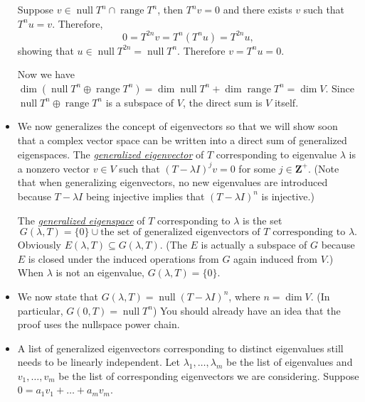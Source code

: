 \documentclass{article}
\newcommand{\df}[1]{\ul{\textit{#1}}}
\newcommand{\Z}{\mathbf{Z}}
\newcommand{\n}{\operatorname{null}}
\renewcommand{\r}{\operatorname{range}}
\renewcommand{\d}{\dim}
\begin{document}
\begin{itemize}
    Suppose $v \in \n T^n \cap \r T^n$, then $T^n v= 0$ and there exists $v$ such that $T^n u=v$. Therefore, $$0 = T^{2n} v = T^n (T^n u) = T^{2n} u,$$ showing that $u \in \n T^{2n} = \n T^n$. Therefore $v = T^n u = 0$.
    
    Now we have $\d (\n T^n \oplus \r T^n) = \d\n T^n + \d\r T^n = \d V$. Since $\n T^n \oplus \r T^n$ is a subspace of $V$, the direct sum is $V$ itself.
    \item We now generalizes the concept of eigenvectors so that we will show soon that a complex vector space can be written into a direct sum of generalized eigenspaces. The \df{generalized eigenvector} of $T$ corresponding to eigenvalue $\lambda$ is a nonzero vector $v \in V$ such that $(T-\lambda I)^j v = 0$ for some $j \in \Z^+$. (Note that when generalizing eigenvectors, no new eigenvalues are introduced because $T - \lambda I$ being injective implies that $(T -\lambda I)^n$ is injective.)
    
    The \df{generalized eigenspace} of $T$ corresponding to $\lambda$ is the set $$G(\lambda, T) = \{0\} \cup \text{the set of generalized eigenvectors of $T$ corresponding to $\lambda$}.$$
    Obviously $E(\lambda, T) \subseteq G(\lambda, T)$. (The $E$ is actually a subspace of $G$ because $E$ is closed under the induced operations from $G$ again induced from $V$.) When $\lambda$ is not an eigenvalue, $G(\lambda, T) = \{0\}$.
    \item We now state that $G(\lambda, T) = \n (T - \lambda I)^n$, where $n = \d V$. (In particular, $G(0,T) = \n T^n$) You should already have an idea that the proof uses the nullspace power chain.
    \item A list of generalized eigenvectors corresponding to distinct eigenvalues still needs to be linearly independent. Let $\lambda_1,\dots,\lambda_m$ be the list of eigenvalues and $v_1,\dots,v_m$ be the list of corresponding eigenvectors we are considering. Suppose $0 = a_1v_1 + \dots + a_mv_m$.
    

\end{itemize}
\end{document}
